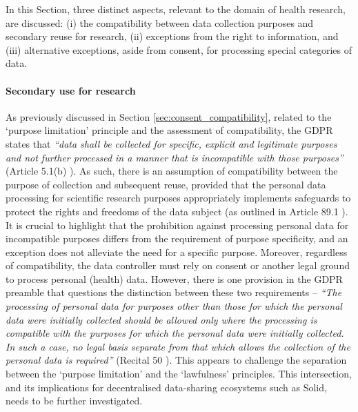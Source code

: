 In this Section, three distinct aspects, relevant to the domain of health research, are discussed: (i) the compatibility between data collection purposes and secondary reuse for research, (ii) exceptions from the right to information, and (iii) alternative exceptions, aside from consent, for processing special categories of data.

\paragraph{Secondary use for research}
As previously discussed in Section \ref{sec:consent_compatibility}, related to the `purpose limitation' principle and the assessment of compatibility, the GDPR states that \textit{``data shall be collected for specific, explicit and legitimate purposes and not further processed in a manner that is incompatible with those purposes''} (Article 5.1(b) \citeyearpar{noauthor_regulation_2016}).
As such, there is an assumption of compatibility between the purpose of collection and subsequent reuse, provided that the personal data processing for scientific research purposes appropriately implements safeguards to protect the rights and freedoms of the data subject (as outlined in Article 89.1 \citeyearpar{noauthor_regulation_2016}).
It is crucial to highlight that the prohibition against processing personal data for incompatible purposes differs from the requirement of purpose specificity, and an exception does not alleviate the need for a specific purpose.
Moreover, regardless of compatibility, the data controller must rely on consent or another legal ground to process personal (health) data.
However, there is one provision in the GDPR preamble that questions the distinction between these two requirements -- \textit{``The processing of personal data for purposes other than those for which the personal data were initially collected should be allowed only where the processing is compatible with the purposes for which the personal data were initially collected. In such a case, no legal basis separate from that which allows the collection of the personal data is required''} (Recital 50 \citeyearpar{noauthor_regulation_2016}).
This appears to challenge the separation between the `purpose limitation' and the `lawfulness' principles.
This intersection, and its implications for decentralised data-sharing ecosystems such as Solid, needs to be further investigated.

